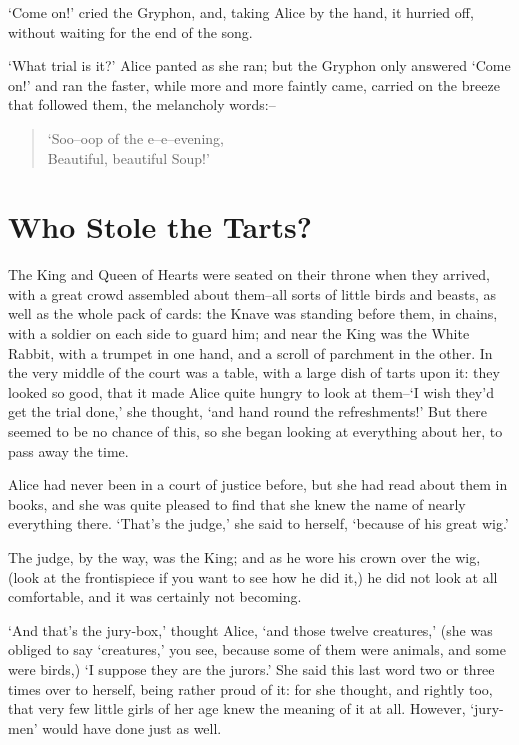 \documentclass[12pt]{book}
\begin{document}
  `Come on!' cried the Gryphon, and, taking Alice by the hand,
it hurried off, without waiting for the end of the song.

  `What trial is it?' Alice panted as she ran; but the Gryphon
only answered `Come on!' and ran the faster, while more and more
faintly came, carried on the breeze that followed them, the
melancholy words:--

\begin{verse}
    `Soo--oop of the e--e--evening,\\
        Beautiful, beautiful Soup!'
\end{verse}

\chapter{Who Stole the Tarts?}

  The King and Queen of Hearts were seated on their throne when
they arrived, with a great crowd assembled about them--all sorts
of little birds and beasts, as well as the whole pack of cards:
the Knave was standing before them, in chains, with a soldier on
each side to guard him; and near the King was the White Rabbit,
with a trumpet in one hand, and a scroll of parchment in the
other.  In the very middle of the court was a table, with a large
dish of tarts upon it:  they looked so good, that it made Alice
quite hungry to look at them--`I wish they'd get the trial done,'
she thought, `and hand round the refreshments!'  But there seemed
to be no chance of this, so she began looking at everything about
her, to pass away the time.

  Alice had never been in a court of justice before, but she had
read about them in books, and she was quite pleased to find that
she knew the name of nearly everything there.  `That's the
judge,' she said to herself, `because of his great wig.'

  The judge, by the way, was the King; and as he wore his crown
over the wig, (look at the frontispiece if you want to see how he
did it,) he did not look at all comfortable, and it was certainly
not becoming.

  `And that's the jury-box,' thought Alice, `and those twelve
creatures,' (she was obliged to say `creatures,' you see, because
some of them were animals, and some were birds,) `I suppose they
are the jurors.'  She said this last word two or three times over
to herself, being rather proud of it:  for she thought, and
rightly too, that very few little girls of her age knew the
meaning of it at all.  However, `jury-men' would have done just
as well.
\end{document}
